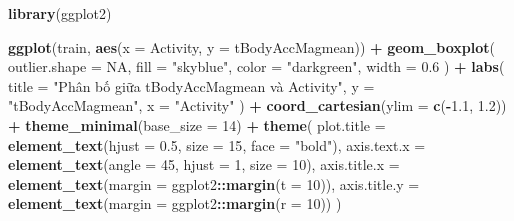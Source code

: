 \documentclass[
]{article}
\newenvironment{Shaded}{\begin{snugshade}}{\end{snugshade}}
\newcommand{\AttributeTok}[1]{\textcolor[rgb]{0.13,0.29,0.53}{#1}}
\newcommand{\ConstantTok}[1]{\textcolor[rgb]{0.56,0.35,0.01}{#1}}
\newcommand{\DecValTok}[1]{\textcolor[rgb]{0.00,0.00,0.81}{#1}}
\newcommand{\FloatTok}[1]{\textcolor[rgb]{0.00,0.00,0.81}{#1}}
\newcommand{\FunctionTok}[1]{\textcolor[rgb]{0.13,0.29,0.53}{\textbf{#1}}}
\newcommand{\NormalTok}[1]{#1}
\newcommand{\SpecialCharTok}[1]{\textcolor[rgb]{0.81,0.36,0.00}{\textbf{#1}}}
\newcommand{\StringTok}[1]{\textcolor[rgb]{0.31,0.60,0.02}{#1}}
\begin{document}
\begin{Shaded}
\begin{Highlighting}[]
\FunctionTok{library}\NormalTok{(ggplot2)}

\FunctionTok{ggplot}\NormalTok{(train, }\FunctionTok{aes}\NormalTok{(}\AttributeTok{x =}\NormalTok{ Activity, }\AttributeTok{y =}\NormalTok{ tBodyAccMagmean)) }\SpecialCharTok{+}
  \FunctionTok{geom\_boxplot}\NormalTok{(}
    \AttributeTok{outlier.shape =} \ConstantTok{NA}\NormalTok{,}
    \AttributeTok{fill =} \StringTok{"skyblue"}\NormalTok{,}
    \AttributeTok{color =} \StringTok{"darkgreen"}\NormalTok{,}
    \AttributeTok{width =} \FloatTok{0.6}
\NormalTok{  ) }\SpecialCharTok{+}
  \FunctionTok{labs}\NormalTok{(}
    \AttributeTok{title =} \StringTok{"Phân bố giữa tBodyAccMagmean và Activity"}\NormalTok{,}
    \AttributeTok{y =} \StringTok{"tBodyAccMagmean"}\NormalTok{,}
    \AttributeTok{x =} \StringTok{"Activity"}
\NormalTok{  ) }\SpecialCharTok{+}
  \FunctionTok{coord\_cartesian}\NormalTok{(}\AttributeTok{ylim =} \FunctionTok{c}\NormalTok{(}\SpecialCharTok{{-}}\FloatTok{1.1}\NormalTok{, }\FloatTok{1.2}\NormalTok{)) }\SpecialCharTok{+} 
  \FunctionTok{theme\_minimal}\NormalTok{(}\AttributeTok{base\_size =} \DecValTok{14}\NormalTok{) }\SpecialCharTok{+}
  \FunctionTok{theme}\NormalTok{(}
    \AttributeTok{plot.title =} \FunctionTok{element\_text}\NormalTok{(}\AttributeTok{hjust =} \FloatTok{0.5}\NormalTok{, }\AttributeTok{size =} \DecValTok{15}\NormalTok{, }\AttributeTok{face =} \StringTok{"bold"}\NormalTok{),}
    \AttributeTok{axis.text.x =} \FunctionTok{element\_text}\NormalTok{(}\AttributeTok{angle =} \DecValTok{45}\NormalTok{, }\AttributeTok{hjust =} \DecValTok{1}\NormalTok{, }\AttributeTok{size =} \DecValTok{10}\NormalTok{),}
    \AttributeTok{axis.title.x =} \FunctionTok{element\_text}\NormalTok{(}\AttributeTok{margin =}\NormalTok{ ggplot2}\SpecialCharTok{::}\FunctionTok{margin}\NormalTok{(}\AttributeTok{t =} \DecValTok{10}\NormalTok{)),}
    \AttributeTok{axis.title.y =} \FunctionTok{element\_text}\NormalTok{(}\AttributeTok{margin =}\NormalTok{ ggplot2}\SpecialCharTok{::}\FunctionTok{margin}\NormalTok{(}\AttributeTok{r =} \DecValTok{10}\NormalTok{))}
\NormalTok{  )}
\end{Highlighting}
\end{Shaded}
\end{document}
